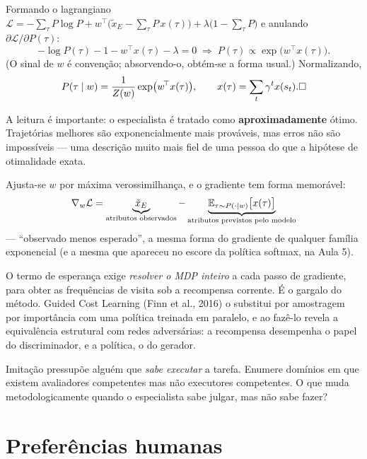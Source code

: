 \documentclass[11pt, a4paper]{article}
\newcommand{\traj}{\tau}
\begin{document}
\begin{provabox}
Formando o lagrangiano
$\mathcal{L} = -\sum_\traj P\log P + w^{\!\top}\bigl(\tilde x_E - \sum_\traj P\,x(\traj)\bigr) + \lambda\bigl(1-\sum_\traj P\bigr)$
e anulando $\partial\mathcal{L}/\partial P(\traj)$:
\[
  -\log P(\traj) - 1 - w^{\!\top}x(\traj) - \lambda = 0
  \;\Longrightarrow\;
  P(\traj) \propto \exp\bigl(w^{\!\top}x(\traj)\bigr).
\]
(O sinal de $w$ é convenção; absorvendo-o, obtém-se a forma usual.) Normalizando,
\[
  P(\traj\mid w) = \frac{1}{Z(w)}\exp\bigl(w^{\!\top}x(\traj)\bigr),
  \qquad x(\traj) = \sum_t \gamma^{t}x(s_t). \hfill\square
\]
\end{provabox}

A leitura é importante: o especialista é tratado como \textbf{aproximadamente}
ótimo. Trajetórias melhores são exponencialmente mais prováveis, mas erros não
são impossíveis --- uma descrição muito mais fiel de uma pessoa do que a
hipótese de otimalidade exata.

Ajusta-se $w$ por máxima verossimilhança, e o gradiente tem forma memorável:
\[
  \nabla_w \mathcal{L}
  = \underbrace{\tilde x_{E}}_{\text{atributos observados}}
  - \underbrace{\E_{\traj\sim P(\cdot\mid w)}\bigl[x(\traj)\bigr]}_{\text{atributos previstos pelo modelo}}
\]
--- ``observado menos esperado'', a mesma forma do gradiente de qualquer família
exponencial (e a mesma que apareceu no escore da política softmax, na Aula 5).

\begin{alertabox}
O termo de esperança exige \emph{resolver o MDP inteiro} a cada passo de
gradiente, para obter as frequências de visita sob a recompensa corrente. É o
gargalo do método. Guided Cost Learning (Finn et al., 2016) o substitui por
amostragem por importância com uma política treinada em paralelo, e ao fazê-lo
revela a equivalência estrutural com redes adversárias: a recompensa
desempenha o papel do discriminador, e a política, o do gerador.
\end{alertabox}

\begin{discbox}
Imitação pressupõe alguém que \emph{sabe executar} a tarefa. Enumere domínios em
que existem avaliadores competentes mas não executores competentes. O que muda
metodologicamente quando o especialista sabe julgar, mas não sabe fazer?
\end{discbox}

\section{Preferências humanas}
\end{document}
